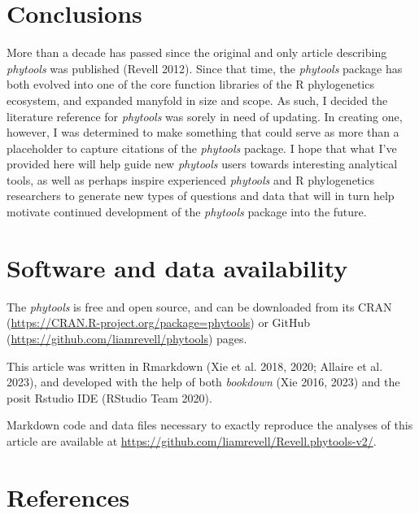 \documentclass[fleqn,10pt,lineno]{wlpeerj} %
\begin{document}
\hypertarget{conclusions}{%
\section{Conclusions}\label{conclusions}}

More than a decade has passed since the original and only article describing \emph{phytools} was published (Revell 2012). Since that time, the \emph{phytools} package has both evolved into one of the core function libraries of the R phylogenetics ecosystem, and expanded manyfold in size and scope. As such, I decided the literature reference for \emph{phytools} was sorely in need of updating. In creating one, however, I was determined to make something that could serve as more than a placeholder to capture citations of the \emph{phytools} package. I hope that what I've provided here will help guide new \emph{phytools} users towards interesting analytical tools, as well as perhaps inspire experienced \emph{phytools} and R phylogenetics researchers to generate new types of questions and data that will in turn help motivate continued development of the \emph{phytools} package into the future.

\hypertarget{software-and-data-availability}{%
\section{Software and data availability}\label{software-and-data-availability}}

The \emph{phytools} is free and open source, and can be downloaded from its CRAN (\url{https://CRAN.R-project.org/package=phytools}) or GitHub (\url{https://github.com/liamrevell/phytools}) pages.

This article was written in Rmarkdown (Xie et al. 2018, 2020; Allaire et al. 2023), and developed with the help of both \emph{bookdown} (Xie 2016, 2023) and the posit Rstudio IDE (RStudio Team 2020).

Markdown code and data files necessary to exactly reproduce the analyses of this article are available at \url{https://github.com/liamrevell/Revell.phytools-v2/}.

\hypertarget{references}{%
\section*{References}\label{references}}
\end{document}

